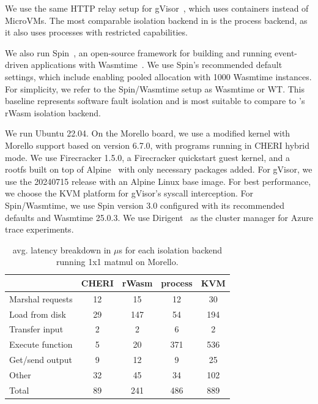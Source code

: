We use the same HTTP relay setup for gVisor~\cite{gvisor}, which uses containers instead of MicroVMs. 
The most comparable isolation backend in \dandelion is the process backend, as it also uses processes with restricted capabilities.

We also run Spin~\cite{spin}, an open-source framework for building and running event-driven applications with Wasmtime~\cite{wasmtime}. We use Spin's recommended default settings, which include enabling pooled allocation with 1000 Wasmtime instances.
For simplicity, we refer to the Spin/Wasmtime setup as Wasmtime or WT.
This baseline represents software fault isolation and is most suitable to compare to \dandelion's rWasm isolation backend.

We run Ubuntu 22.04.
On the Morello board, we use a modified kernel with Morello support based on version 6.7.0, with programs running in CHERI hybrid mode.
We use Firecracker 1.5.0, a Firecracker quickstart guest kernel, and a rootfs built on top of Alpine~\cite{alpine} with only necessary packages added.
For gVisor, we use the 20240715 release with an Alpine Linux base image. For best performance, we choose the KVM platform for gVisor’s syscall interception.
For Spin/Wasmtime, we use Spin version 3.0 configured with its recommended defaults and Wasmtime 25.0.3.
We use Dirigent~\cite{dirigent} as the cluster manager for Azure trace experiments.

\begin{table}[t]
\begin{tabular}{|l|c|c|c|c|}
\hline
                    & CHERI & rWasm & process & KVM \\ \hline
Marshal requests    & 12    & 15    & 12    & 30    \\ \hline
Load from disk      & 29    & 147   & 54    & 194   \\ \hline
Transfer input      & 2     & 2     & 6     & 2     \\ \hline
Execute function    & 5     & 20    & 371   & 536   \\ \hline
Get/send output     & 9     & 12    & 9     & 25    \\ \hline
Other               & 32    & 45    & 34    & 102   \\ \hline \hline
Total               & 89    & 241   & 486   & 889   \\ \hline
\end{tabular}
\caption{\dandelion avg. latency breakdown in $\mu$s for each isolation backend running 1x1 matmul on Morello.}
\label{tab:latency-breakdown}
\end{table}


